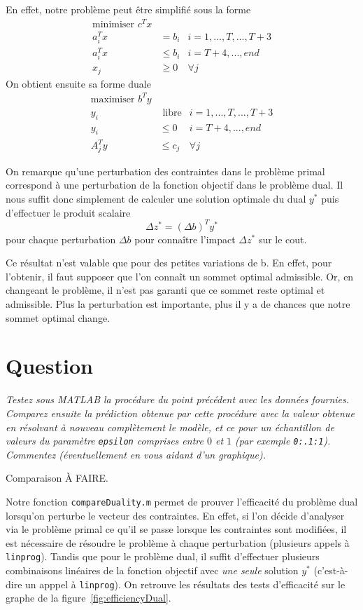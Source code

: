 \documentclass[12pt,oneside,a4paper]{article}
\newcommand{\question}
{
\addtocounter{section}{1}
\section*{Question \thesection}
}
\begin{document}
En effet, notre problème peut être simplifié sous la forme
\begin{align*} 
	\text{minimiser } c^T x \\
	a_i^T x &= b_i  & i = 1,...,T,...,T+3 \\
  a_i^T x &\leq b_i & i = T+4,...,end \\
	x_j &\geq 0 & \forall j
\end{align*}
On obtient ensuite sa forme duale
\begin{align*} 
	\text{maximiser } b^T y \\
	y_i &\text{ libre} & i = 1,...,T,...,T+3 \\
  y_i &\leq 0 & i = T+4,...,end \\
  A_j^T y &\leq c_j & \forall j
\end{align*}

On remarque qu'une perturbation des contraintes dans le problème primal
correspond à une perturbation de la fonction objectif dans le problème dual.
Il nous suffit donc simplement de calculer une solution optimale du dual $y^{*}$
puis d'effectuer le produit scalaire
\[ \Delta z^{*} = (\Delta b)^T y^{*} \]
pour chaque perturbation $\Delta b$ pour conna\^itre l'impact $\Delta z^{*}$
sur le cout.

Ce résultat n'est valable que pour des petites variations de b.
En effet, pour l'obtenir, il faut supposer que l'on connaît un sommet optimal admissible.
Or, en changeant le problème, il n'est pas garanti que ce sommet reste optimal et admissible. 
Plus la perturbation est importante, plus il y a de chances que notre sommet optimal change.

\question %
\emph{Testez sous MATLAB la procédure du point précédent avec les données
fournies. Comparez ensuite la prédiction obtenue par cette procédure
avec la valeur obtenue en résolvant à nouveau complètement le modèle,
et ce pour un échantillon de valeurs du paramètre \texttt{epsilon} comprises
entre $0$ et $1$ (par exemple \texttt{0:.1:1}). 
Commentez (éventuellement en vous aidant d'un graphique).}

Comparaison À FAIRE.

Notre fonction \texttt{compareDuality.m} permet de prouver l'efficacité
du problème dual lorsqu'on perturbe le vecteur des contraintes.
En effet, si l'on décide d'analyser via le problème primal ce qu'il 
se passe lorsque les contraintes sont modifiées, il est nécessaire de 
résoudre le problème à chaque perturbation 
(plusieurs appels à \texttt{linprog}).
Tandis que pour le problème dual,
il suffit d'effectuer plusieurs combinaisons linéaires de la fonction objectif
avec \emph{une seule} solution $y^{*}$ 
(c'est-à-dire un apppel à \texttt{linprog}).
On retrouve les résultats des tests d'efficacité
sur le graphe de la figure~\ref{fig:efficiencyDual}. 
\end{document}
